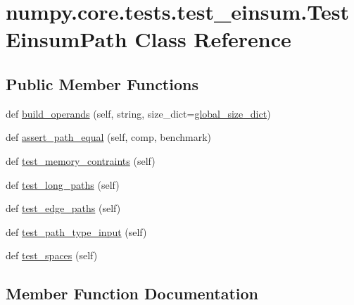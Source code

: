 \hypertarget{classnumpy_1_1core_1_1tests_1_1test__einsum_1_1TestEinsumPath}{}\section{numpy.\+core.\+tests.\+test\+\_\+einsum.\+Test\+Einsum\+Path Class Reference}
\label{classnumpy_1_1core_1_1tests_1_1test__einsum_1_1TestEinsumPath}
\subsection*{Public Member Functions}
\begin{DoxyCompactItemize}
\item 
def \hyperlink{classnumpy_1_1core_1_1tests_1_1test__einsum_1_1TestEinsumPath_aff98667bc9418ab5f5bb75f86d0e58fb}{build\+\_\+operands} (self, string, size\+\_\+dict=\hyperlink{namespacenumpy_1_1core_1_1tests_1_1test__einsum_a7987e3439d0eab01bcf675229bf0f787}{global\+\_\+size\+\_\+dict})
\item 
def \hyperlink{classnumpy_1_1core_1_1tests_1_1test__einsum_1_1TestEinsumPath_a8443086976bb764f4e86d238b2bc462a}{assert\+\_\+path\+\_\+equal} (self, comp, benchmark)
\item 
def \hyperlink{classnumpy_1_1core_1_1tests_1_1test__einsum_1_1TestEinsumPath_a02168b7a23cfa445d3e88831524bf50b}{test\+\_\+memory\+\_\+contraints} (self)
\item 
def \hyperlink{classnumpy_1_1core_1_1tests_1_1test__einsum_1_1TestEinsumPath_aa38d206989e838065817fbf6654c3e22}{test\+\_\+long\+\_\+paths} (self)
\item 
def \hyperlink{classnumpy_1_1core_1_1tests_1_1test__einsum_1_1TestEinsumPath_a872a7067d95b7f08eafbff53f2d795c3}{test\+\_\+edge\+\_\+paths} (self)
\item 
def \hyperlink{classnumpy_1_1core_1_1tests_1_1test__einsum_1_1TestEinsumPath_aef1cb54232cb1984dc5f4cc19f0b2bd5}{test\+\_\+path\+\_\+type\+\_\+input} (self)
\item 
def \hyperlink{classnumpy_1_1core_1_1tests_1_1test__einsum_1_1TestEinsumPath_a2e2ca5bb8f7d69b890859c81576a905f}{test\+\_\+spaces} (self)
\end{DoxyCompactItemize}


\subsection{Member Function Documentation}
\mbox{\label{classnumpy_1_1core_1_1tests_1_1test__einsum_1_1TestEinsumPath_a8443086976bb764f4e86d238b2bc462a}} 
